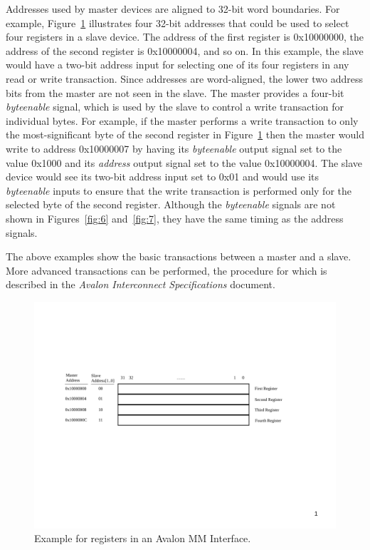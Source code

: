 \documentclass[11pt, twoside, pdftex]{article}
\begin{document}
Addresses used by master devices are aligned to 32-bit word boundaries. For example, 
Figure~\ref{fig:8} illustrates four 32-bit addresses that could be used to select four
registers in a slave device. The address of the first register is {\sf 0x10000000}, the
address of the second register is {\sf 0x10000004}, and so on. In this example, the slave
would have a two-bit address input for selecting one of its four registers in any read or write
transaction. Since addresses are word-aligned, the lower two address bits from the master 
are not seen in the slave. The master provides a four-bit {\it byteenable} signal, which
is used by the slave to control a write transaction for individual bytes. For example, if the master
performs a write transaction to only the most-significant byte of the second register
in Figure~\ref{fig:8} then the master would write to address {\sf 0x10000007} by having its
{\it byteenable} output signal set to the value {\sf 0x1000} and its {\it address} output signal set to the value {\sf 0x10000004}.
The slave device would see its two-bit address input set to {\sf 0x01} and would use its {\it byteenable} inputs
to ensure that the write transaction is performed only for the selected byte of 
the second register. Although the {\it byteenable} signals are not shown in Figures~\ref{fig:6}
and~\ref{fig:7}, they have the same timing as the address signals.

The above examples show the basic transactions between a master and a slave. 
More advanced transactions can be performed, the procedure for which is described in 
the {\it Avalon Interconnect Specifications} document.

\begin{figure}[h!]
   \begin{center}
        \includegraphics[scale=0.85]{figures/figure8.pdf}
   \end{center}
   \caption{Example for registers in an Avalon MM Interface.}
	\label{fig:8}
\end{figure}
\end{document}
